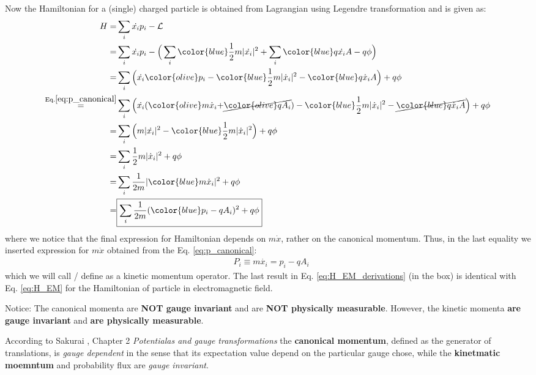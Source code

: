 \documentclass[11pt]{article}
\begin{document}
Now the Hamiltonian  for a (single) charged particle is obtained from  Lagrangian using Legendre transformation and is given as:
\begin{align}
    H =  & \sum_i \dot{x_i} p_i - \mathcal{L} \nonumber  \\ 
      =  & \sum_i \dot{x_i} p_i - \Big(  \sum_i {\color{blue} \frac{1}{2}  m|\dot{x_i}|^2 } + \sum_i  {\color{blue} q\dot{x_i}A } -q \phi \Big) \nonumber \\
       =& \sum_i   \Big( \dot{ x_i}   {\color{olive} p_i } -{\color{blue} \frac{1}{2} m |\dot x_i |^2} -  {\color{blue} q \dot x_i  A} \Big) + q \phi  \nonumber \\
       \stackrel{\text{Eq.} \ref{eq:p_canonical}}{=}& 
       \sum_i   \Big( \dot{ x_i}   ({\color{olive} m \dot x_i +}  \cancel{ \color{olive} q  A_i } )  -{\color{blue} \frac{1}{2} m |\dot x_i |^2}   - \cancel{ {\color{blue} q \dot x_i  A} } \Big) + q \phi    \nonumber  \\
       =&  \sum_i   \Big(  m  |\dot{ x_i}|^2   -{\color{blue} \frac{1}{2} m |\dot x_i |^2}    \Big)  +q \phi  \nonumber \\       
      =&  \sum_i \frac{1}{2} m |\dot x_i |^2 +q \phi   \nonumber \\ %
      =&  \sum_i \frac{1}{2m} | {\color{blue} m \dot x_i} |^2 +q \phi   \nonumber \\
       = &\boxed{ \sum_i \frac{1}{2m } ({\color{blue}p_i - qA_i})^2  +q \phi }
       \label{eq:H_EM_derivations}
\end{align}
where we notice that  the final expression for Hamiltonian depends on $m\dot x$, rather on  the canonical momentum. 
Thus, in the last equality  we  inserted expression for  $m\dot x$  obtained from  the Eq. \ref{eq:p_canonical}:
 \begin{align}
       &\boxed{ P_i \equiv m\dot{x_i} = p_i - q A_i }     
\label{eq:P_kinetic}
\end{align}
which we will call / define  as  a kinetic momentum operator.
The last result in Eq. \ref{eq:H_EM_derivations} (in the box) is identical with Eq. \ref{eq:H_EM} for the Hamiltonian of particle in electromagnetic field.

Notice: The canonical momenta are {\bf NOT gauge invariant} and are {\bf NOT physically measurable}.  However, the kinetic momenta {\bf are gauge invariant} and  {\bf are physically measurable}.

According  to Sakurai \cite{Sakurai-2nd_ed}, Chapter 2 \emph{Potentialas and gauge transformations}  the  {\bf canonical momentum}, defined as  the generator of translations, is \emph{gauge dependent} in the sense that its expectation value depend on the particular gauge chose, while the  {\bf kinetmatic moemntum}  and probability flux are  \emph{gauge invariant}.
\end{document}
